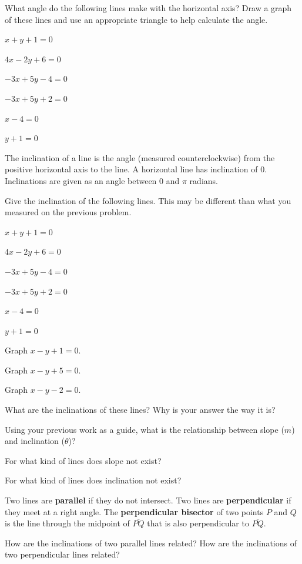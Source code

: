 \bq What angle do the following lines make with the horizontal axis? Draw a graph of these lines and use an appropriate triangle to help calculate the angle.
\be
\item $x+y+1=0$
\item $4x-2y+6=0$
\item $-3x+5y-4=0$
\item $-3x+5y+2=0$
\item $x-4=0$
\item $y+1=0$
\ee
\eq

\begin{info} The inclination of a line is the angle (measured counterclockwise) from the positive horizontal axis to the line. A horizontal line has inclination of $0$. Inclinations are given as an angle between $0$ and $\pi$ radians. \end{info}

\bq Give the inclination of the following lines. This may be different than what you measured on the previous problem.
\be
\item $x+y+1=0$
\item $4x-2y+6=0$
\item $-3x+5y-4=0$
\item $-3x+5y+2=0$
\item $x-4=0$
\item $y+1=0$
\ee
\eq

\bq \be
\item Graph $x-y+1=0$.
\item Graph $x-y+5=0$.
\item Graph $x-y-2=0$.
\item What are the inclinations of these lines? Why is your answer the way it is?
\ee \eq

\bq Using your previous work as a guide, what is the relationship between slope ($m$) and inclination ($\theta$)?
\eq
\bq \be \item For what kind of lines does slope not exist?
\item For what kind of lines does inclination not exist?
\ee
\eq

\begin{info} Two lines are \textbf{parallel} if they do not intersect. Two lines are \textbf{perpendicular} if they meet at a right angle. The \textbf{perpendicular bisector} of two points $P$ and $Q$ is the line through the midpoint of $\overline{PQ}$ that is also perpendicular to $\overline{PQ}$.
\end{info}

\bq How are the inclinations of two parallel lines related? How are the inclinations of two perpendicular lines related?
\eq

